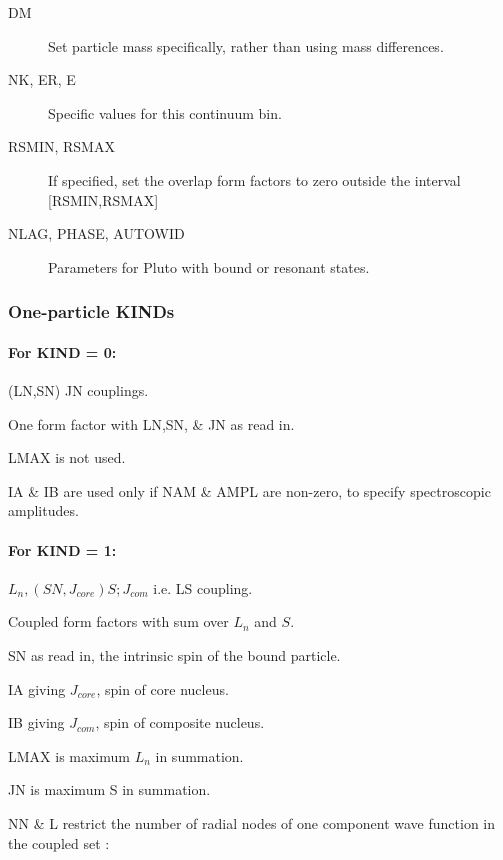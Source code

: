 \documentclass[11pt]{article}
\begin{document}
\begin{description}
\item[DM] Set particle mass specifically, rather than using mass differences.

\item[NK, ER, E] Specific values for this continuum bin.




\item[RSMIN, RSMAX] If specified, set the overlap form factors to zero outside the interval [RSMIN,RSMAX]


\item[NLAG, PHASE, AUTOWID] Parameters for {\sc Pluto} with bound or resonant states.


\end{description}

\subsubsection{One-particle KINDs}

\paragraph{For KIND = 0:}   (LN,SN) JN couplings.

One form factor with LN,SN, \& JN as read in.

LMAX is not used.

IA \& IB are used only if NAM \& AMPL are non-zero, to specify
spectroscopic amplitudes.

\paragraph{For KIND = 1:}  $L_{n},(SN,J_{core})S; J_{com}$     i.e. LS coupling.

Coupled form factors with sum over $L_{n}$ and $S$.

SN as read in, the intrinsic spin of the bound particle.

IA giving $J_{core}$, spin of core nucleus.

IB giving $J_{com}$,  spin of composite nucleus.

LMAX is maximum $L_{n}$ in summation.

JN   is maximum S  in summation.

NN \& L restrict the number of radial nodes of one component
wave function in the coupled set :
\end{document}
